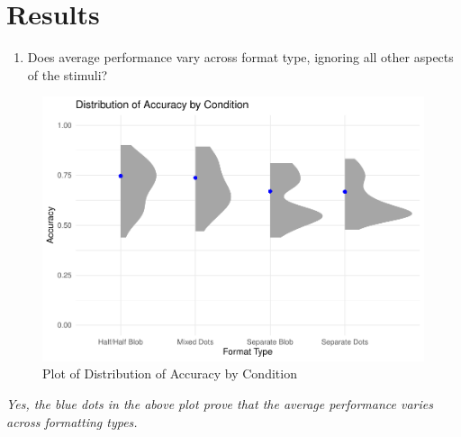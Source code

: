 \documentclass[
  man,floatsintext]{apa6}
\providecommand{\tightlist}{%
  \setlength{\itemsep}{0pt}\setlength{\parskip}{0pt}}
\begin{document}
\newpage

\section{Results}\label{results}

\begin{enumerate}
\def\labelenumi{\arabic{enumi}.}
\tightlist
\item
  Does average performance vary across format type, ignoring all other aspects of the stimuli?
\end{enumerate}

\begin{figure}

{\centering \includegraphics[width=1\linewidth]{Chin_WA11_files/figure-latex/returnplot-1} 

}

\caption{Plot of Distribution of Accuracy by Condition}\label{fig:returnplot}
\end{figure}

\emph{Yes, the blue dots in the above plot prove that the average performance varies across formatting types.}
\end{document}
